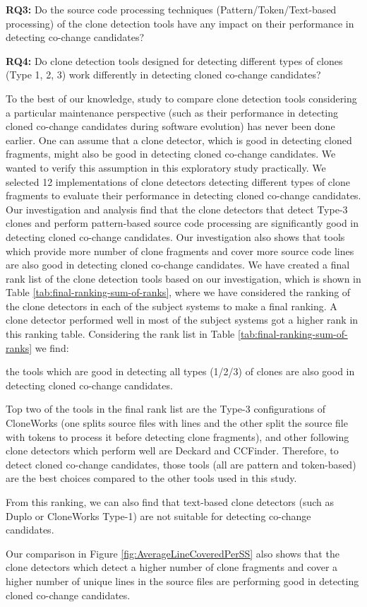 \documentclass[review]{elsarticle}
\begin{document}
\vspace{0.15cm}
\noindent
\textbf{RQ3: }Do the source code processing techniques (Pattern/Token/Text-based processing) of the clone detection tools have any impact on their performance in detecting co-change candidates?

\vspace{0.15cm}
\noindent
\textbf{RQ4: }Do clone detection tools designed for detecting different types of clones (Type 1, 2, 3) work differently in detecting cloned co-change candidates?

To the best of our knowledge, study to compare clone detection tools considering a particular maintenance perspective (such as their performance in detecting cloned co-change candidates during software evolution) has never been done earlier. One can assume that a clone detector, which is good in detecting cloned fragments, might also be good in detecting cloned co-change candidates. We wanted to verify this assumption in this exploratory study practically. We selected 12 implementations of clone detectors detecting different types of clone fragments to evaluate their performance in detecting cloned co-change candidates. Our investigation and analysis find that the clone detectors that detect Type-3 clones and perform pattern-based source code processing are significantly good in detecting cloned co-change candidates. Our investigation also shows that tools which provide more number of clone fragments and cover more source code lines are also good in detecting cloned co-change candidates. We have created a final rank list of the clone detection tools based on our investigation, which is shown in Table \ref{tab:final-ranking-sum-of-ranks}, where we have considered the ranking of the clone detectors in each of the subject systems to make a final ranking. A clone detector performed well in most of the subject systems got a higher rank in this ranking table. Considering the rank list in Table \ref{tab:final-ranking-sum-of-ranks} we find:
\begin{enumerate*}[label=(\roman*)]
  \item the tools which are good in detecting all types (1/2/3) of clones are also good in detecting cloned co-change candidates. 
  \item Top two of the tools in the final rank list are the Type-3 configurations of CloneWorks (one splits source files with lines and the other split the source file with tokens to process it before detecting clone fragments), and other following clone detectors which perform well are Deckard and CCFinder. Therefore, to detect cloned co-change candidates, those tools (all are pattern and token-based) are the best choices compared to the other tools used in this study.
  \item From this ranking, we can also find that text-based clone detectors (such as Duplo or CloneWorks Type-1) are not suitable for detecting co-change candidates.
  \item Our comparison in Figure \ref{fig:AverageLineCoveredPerSS} also shows that the clone detectors which detect a higher number of clone fragments and cover a higher number of unique lines in the source files are performing good in detecting cloned co-change candidates. 
\end{enumerate*}
\end{document}
